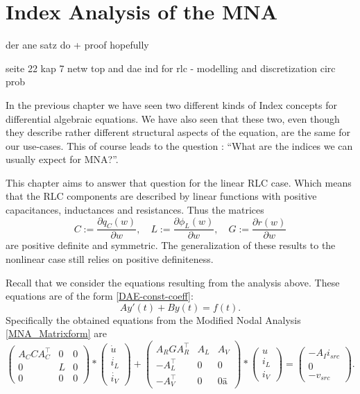 \chapter{Index Analysis of the MNA}

der ane satz do + proof hopefully

seite 22 kap 7 netw top and dae ind for rlc - modelling and discretization circ prob

In the previous chapter we have seen two different kinds of Index concepts for differential algebraic equations. We have also seen that these two, even though they describe rather different structural aspects of the equation, are the same for our use-cases. This of course leads to the question : ``What are the indices we can usually expect for MNA?''.

This chapter aims to answer that question for the linear RLC case. Which means that the RLC components are described by linear functions with positive capacitances, inductances and resistances. Thus the matrices
\begin{displaymath}
	C:=\frac{\partial q_C(w)}{\partial w}, \quad L:=\frac{\partial \phi_L(w)}{\partial w}, \quad G:=\frac{\partial r(w)}{\partial w}
\end{displaymath}
are positive definite and symmetric. The generalization of these results to the nonlinear case still relies on positive definiteness.

Recall that we consider the equations resulting from the analysis above. These equations are of the form \ref{DAE-const-coeff}:
\begin{displaymath}
	A y'(t) + B y(t) = f(t).
\end{displaymath}
Specifically the obtained equations from the Modified Nodal Analysis \ref{MNA_Matrixform} are
\begin{displaymath}
	\begin{pmatrix}
		A_C C A_C^\top & 0 & 0 \\
		0 & L & 0 \\
		0 & 0 & 0
	\end{pmatrix}
	*
	\begin{pmatrix}
		\dot{u} \\
		\dot{i_L} \\
		\dot{i_V}
	\end{pmatrix}
	+
	\begin{pmatrix}
		A_R G A_R^\top & A_L & A_V \\
		-A_L^\top & 0 & 0 \\
		-A_V^\top & 0 & 0 ä
	\end{pmatrix}
	*
	\begin{pmatrix}
		u \\
		i_L \\
		i_V
	\end{pmatrix}
	=
	\begin{pmatrix}
		-A_I i_{src} \\
		0 \\
		-v_{src}
	\end{pmatrix}.
\end{displaymath}

